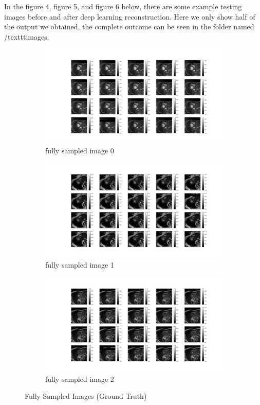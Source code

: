 \documentclass{article}
\begin{document}
In the figure 4, figure 5, and figure 6 below, there are some example testing images before and after deep
learning reconstruction. Here we only show half of the output we obtained, the complete outcome
can be seen in the folder named /texttt{images}.
\begin{figure}[ht]
  \centering
  \begin{subfigure}[b]{0.8\linewidth}
    \includegraphics[width=\linewidth]{../images/No_opt/full_sampling/full_sampling_0.png}
    \caption{fully sampled image 0}
  \end{subfigure}
  \quad
  \begin{subfigure}[b]{0.8\linewidth}
    \includegraphics[width=\linewidth]{../images/No_opt/full_sampling/full_sampling_1.png}
    \caption{fully sampled image 1}
  \end{subfigure}
  \quad
  \begin{subfigure}[b]{0.8\linewidth}
    \includegraphics[width=\linewidth]{../images/No_opt/full_sampling/full_sampling_2.png}
    \caption{fully sampled image 2}
  \end{subfigure}
  \caption{Fully Sampled Images (Ground Truth)}
\end{figure}
\end{document}
